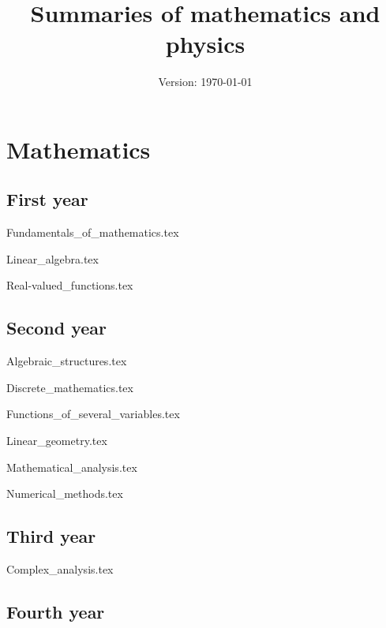 \documentclass{report}
\title{Summaries of mathematics and physics}
\author{}
\date{Version: \today}
\begin{document}
\maketitle
\newpage
\tableofcontents
\newpage
\part{Mathematics}
    \chapter{First year}
    \newpage
        {Fundamentals_of_mathematics.tex}
        \cleardoublepage    
    
        {Linear_algebra.tex}
        \cleardoublepage
        
        {Real-valued_functions.tex}
        \cleardoublepage
    \chapter{Second year}
    \newpage
        {Algebraic_structures.tex}
        \cleardoublepage
        
        {Discrete_mathematics.tex}
        \cleardoublepage
        
        {Functions_of_several_variables.tex}
        \cleardoublepage
        
        {Linear_geometry.tex}
        \cleardoublepage
        
        {Mathematical_analysis.tex}
        \cleardoublepage
        
        {Numerical_methods.tex}
        \cleardoublepage
    \chapter{Third year}
    \newpage
        {Complex_analysis.tex}
        \cleardoublepage
    \chapter{Fourth year}
    \newpage
        
\end{document}
